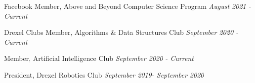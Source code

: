 
\begin{cvskills}

  \cvskill
  {Facebook }
  {Member, Above and Beyond Computer Science Program \hfill \textit{August 2021 - Current}}

  \cvskill
  {Drexel Clubs}
  {Member, Algorithms \& Data Structures Club \hfill \textit{September 2020 - Current}}

  \cvskill
  {}
  {Member, Artificial Intelligence Club \hfill \textit{September 2020 - Current}}
  
  \cvskill
  {}
  {President, Drexel Robotics Club \hfill \textit{September 2019- September 2020}}
\end{cvskills}